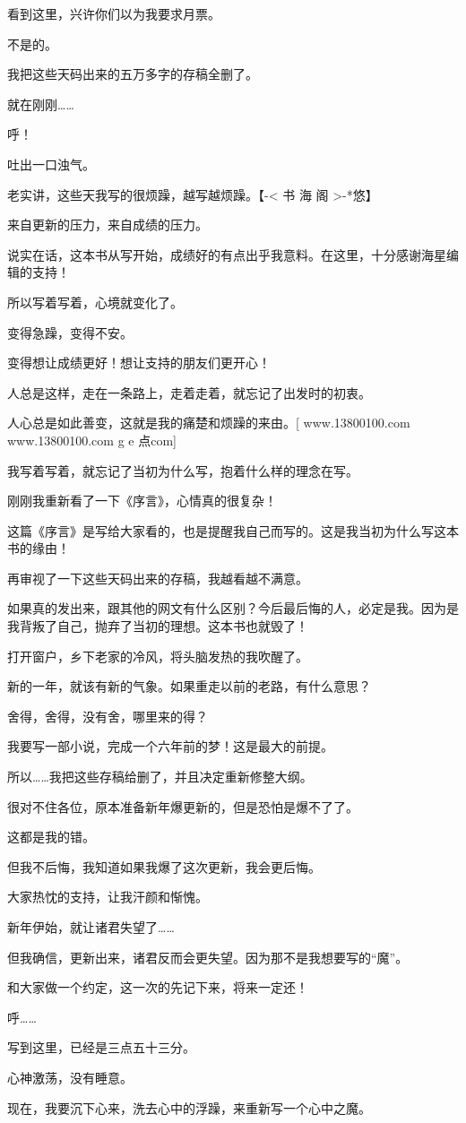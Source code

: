 \begin{this_body}
看到这里，兴许你们以为我要求月票。

不是的。

我把这些天码出来的五万多字的存稿全删了。

就在刚刚……

呼！

吐出一口浊气。

老实讲，这些天我写的很烦躁，越写越烦躁。【-< 书 海 阁 >-*悠】

来自更新的压力，来自成绩的压力。

说实在话，这本书从写开始，成绩好的有点出乎我意料。在这里，十分感谢海星编辑的支持！

所以写着写着，心境就变化了。

变得急躁，变得不安。

变得想让成绩更好！想让支持的朋友们更开心！

人总是这样，走在一条路上，走着走着，就忘记了出发时的初衷。

人心总是如此善变，这就是我的痛楚和烦躁的来由。[ www.13800100.com www.13800100.com g e 点com]

我写着写着，就忘记了当初为什么写，抱着什么样的理念在写。

刚刚我重新看了一下《序言》，心情真的很复杂！

这篇《序言》是写给大家看的，也是提醒我自己而写的。这是我当初为什么写这本书的缘由！

再审视了一下这些天码出来的存稿，我越看越不满意。

如果真的发出来，跟其他的网文有什么区别？今后最后悔的人，必定是我。因为是我背叛了自己，抛弃了当初的理想。这本书也就毁了！

打开窗户，乡下老家的冷风，将头脑发热的我吹醒了。

新的一年，就该有新的气象。如果重走以前的老路，有什么意思？

舍得，舍得，没有舍，哪里来的得？

我要写一部小说，完成一个六年前的梦！这是最大的前提。

所以……我把这些存稿给删了，并且决定重新修整大纲。

很对不住各位，原本准备新年爆更新的，但是恐怕是爆不了了。

这都是我的错。

但我不后悔，我知道如果我爆了这次更新，我会更后悔。

大家热忱的支持，让我汗颜和惭愧。

新年伊始，就让诸君失望了……

但我确信，更新出来，诸君反而会更失望。因为那不是我想要写的“魔”。

和大家做一个约定，这一次的先记下来，将来一定还！

呼……

写到这里，已经是三点五十三分。

心神激荡，没有睡意。

现在，我要沉下心来，洗去心中的浮躁，来重新写一个心中之魔。

\end{this_body}

